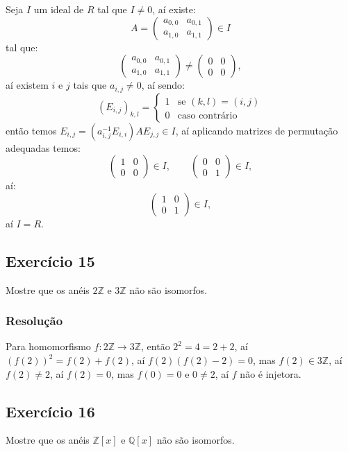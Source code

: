 \documentclass[10pt,a4paper]{article}
\begin{document}
Seja $I$ um ideal de $R$ tal que $I\neq 0$, aí existe:
\[
A=\begin{pmatrix}
a_{0,0}&a_{0,1}\\a_{1,0}&a_{1,1}
\end{pmatrix}\in I
\]
tal que:
\[
\begin{pmatrix}
a_{0,0}&a_{0,1}\\a_{1,0}&a_{1,1}
\end{pmatrix}\neq
\begin{pmatrix}
0&0\\0&0
\end{pmatrix},
\]
aí existem $i$ e $j$ tais que $a_{i,j}\neq 0$, aí sendo:
\[
(E_{i,j})_{k,l}=\left\{\begin{array}{cl}
1&\text{se }(k,l)=(i,j)\\0&\text{caso contrário}
\end{array} \right.
\]
então temos $E_{i,j}=(a_{i,j}^{-1}E_{i,i})AE_{j,j}\in I$, aí aplicando matrizes de permutação adequadas temos:
\[
\begin{pmatrix}
1&0\\0&0
\end{pmatrix}\in I ,\quad\quad\begin{pmatrix}
0&0\\0&1
\end{pmatrix}\in I,
\]
aí:
\[
\begin{pmatrix}
1&0\\0&1
\end{pmatrix}\in I,
\]
aí $I=R$.

\subsection*{Exercício 15}
Mostre que os anéis $2\mathbb{Z}$ e $3\mathbb{Z}$ não são isomorfos.

\subsubsection*{Resolução}

Para homomorfismo $f:2\mathbb{Z}\rightarrow 3\mathbb{Z}$, então $2^2=4=2+2$, aí $(f(2))^2=f(2)+f(2)$, aí $f(2)(f(2)-2)=0$, mas $f(2)\in 3\mathbb{Z}$, aí $f(2)\neq 2$, aí $f(2)=0$, mas $f(0)=0$ e $0\neq 2$, aí $f$ não é injetora.

\subsection*{Exercício 16}
Mostre que os anéis $\mathbb{Z}[x]$ e $\mathbb{Q}[x]$ não são isomorfos.
\end{document}
